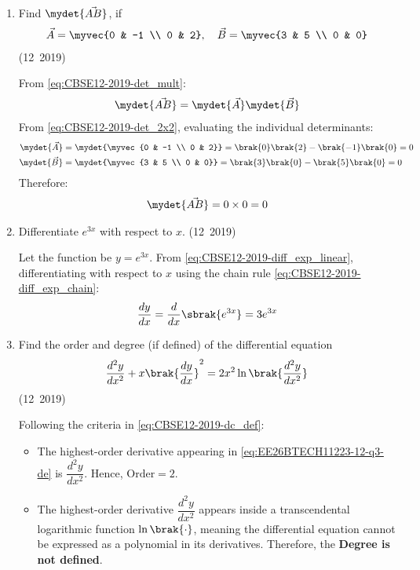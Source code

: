 \begin{enumerate}[label=\thesubsection.\arabic*, ref=\thesubsection.\theenumi]
	
\item Find $\mydet{\vec{AB}}$, if
\begin{align}
	\vec{A} = \myvec{0 & -1 \\ 0 & 2}, \quad \vec{B} = \myvec{3 & 5 \\ 0 & 0}
\end{align}
\hfill (12~2019)

\solution
From \eqref{eq:CBSE12-2019-det_mult}:
\begin{align}
	\mydet{\vec{AB}} = \mydet{\vec{A}} \mydet{\vec{B}}
\end{align}
From \eqref{eq:CBSE12-2019-det_2x2}, evaluating the individual determinants:
\begin{align}
	\mydet{\vec{A}} &= \mydet{\myvec{0 & -1 \\ 0 & 2}} = \brak{0}\brak{2} - \brak{-1}\brak{0} = 0 \\
	\mydet{\vec{B}} &= \mydet{\myvec{3 & 5 \\ 0 & 0}} = \brak{3}\brak{0} - \brak{5}\brak{0} = 0
\end{align}
Therefore:
\begin{align}
	\mydet{\vec{AB}} = 0 \times 0 = 0
\end{align}


\item Differentiate $e^{3x}$ with respect to $x$.
\hfill (12~2019)

\solution
Let the function be $y = e^{3x}$.
From \eqref{eq:CBSE12-2019-diff_exp_linear}, differentiating with respect to $x$ using the chain rule \eqref{eq:CBSE12-2019-diff_exp_chain}:
\begin{align}
	\frac{dy}{dx} = \frac{d}{dx}\sbrak{e^{3x}} = 3e^{3x}
\end{align}


\item Find the order and degree (if defined) of the differential equation
\begin{align}
	\frac{d^2y}{dx^2} + x\brak{\frac{dy}{dx}}^2 = 2x^2\ln\brak{\frac{d^2y}{dx^2}} \label{eq:EE26BTECH11223-12-q3-de}
\end{align}
\hfill (12~2019)

\solution
Following the criteria in \eqref{eq:CBSE12-2019-dc_def}:
\begin{itemize}
	\item The highest-order derivative appearing in \eqref{eq:EE26BTECH11223-12-q3-de} is $\dfrac{d^2y}{dx^2}$. Hence, $\text{Order} = 2$.
	\item The highest-order derivative $\dfrac{d^2y}{dx^2}$ appears inside a transcendental logarithmic function $\ln\brak{\cdot}$, meaning the differential equation cannot be expressed as a polynomial in its derivatives. Therefore, the \textbf{Degree is not defined}.
\end{itemize}


\end{enumerate}
